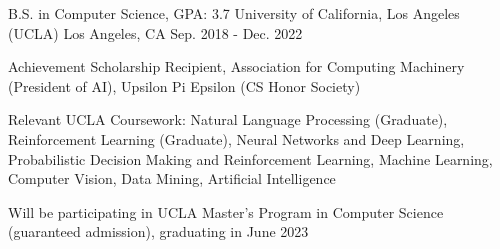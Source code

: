 

\begin{cventries}

  \cventry
    {B.S. in Computer Science, GPA: 3.7} %
    {University of California, Los Angeles (UCLA)} %
    {Los Angeles, CA} %
    {Sep. 2018 - Dec. 2022} %
    {
      \begin{cvitems} %
        \item {Achievement Scholarship Recipient, Association for Computing Machinery
        (President of AI), Upsilon Pi Epsilon (CS Honor Society)}
        \item {Relevant UCLA Coursework: Natural Language Processing (Graduate), Reinforcement Learning (Graduate),
        Neural Networks and Deep Learning, Probabilistic Decision Making and Reinforcement 
        Learning, Machine Learning, Computer Vision, Data Mining, Artificial Intelligence}
        \item {Will be participating in UCLA Master's Program in Computer Science
        (guaranteed admission), graduating in June 2023}
      \end{cvitems}
    }

\end{cventries}
